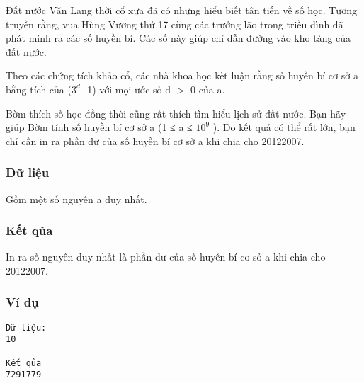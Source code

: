 



   Đất nước Văn Lang thời cổ xưa đã có những hiểu biết tân tiến về số học. Tương truyền rằng, vua Hùng Vương thứ 17 cùng các trưởng lão   trong triều đình đã phát minh ra các số huyền bí. Các số này giúp chỉ dẫn đường vào kho tàng của đất nước.  

   Theo các chứng tích khảo cổ, các nhà khoa học kết luận rằng số huyền bí cơ sở a bằng tích của ($3^{d}$   -1) với mọi ước số d $>$ 0   của a.  

   Bờm thích số học đồng thời cũng rất thích tìm hiểu lịch sử đất nước. Bạn hãy giúp Bờm tính số huyền bí cơ sở a (1 ≤ a ≤ $10^{9}$   ).   Do kết quả có thể rất lớn, bạn chỉ cần in ra phần dư của số huyền bí cơ sở a khi chia cho 20122007.  

\subsubsection{   Dữ liệu  }

   Gồm một số nguyên a duy nhất.  

\subsubsection{   Kết qủa  }

   In ra số nguyên duy nhất là phần dư của số huyền bí cơ sở a khi chia cho 20122007.  

\subsubsection{   Ví dụ  }
\begin{verbatim}
Dữ liệu:
10

Kết qủa
7291779
\end{verbatim}
